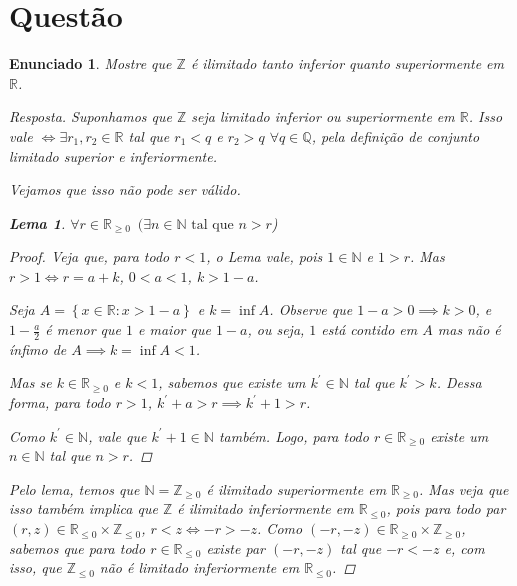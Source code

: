 \documentclass[a4paper,twoside,11pt]{article}
\newtheorem*{enunciado}{Enunciado}
\newtheorem*{lemma}{Lema}
\begin{document}
\section{Questão}
\begin{enunciado}
    Mostre que $\mathbb{Z}$ é ilimitado tanto inferior quanto superiormente em
    $\mathbb{R}$.

    \begin{proof}[Resposta]
        Suponhamos que $\mathbb{Z}$ seja limitado inferior ou superiormente em $\mathbb{R}$.
        Isso vale $\iff \exists r_1, r_2 \in \mathbb{R}$ tal que $r_1 < q$ e $r_2 > q$
        $\forall q \in \mathbb{Q}$, pela definição de conjunto limitado superior e
        inferiormente.

        Vejamos que isso não pode ser válido.

        \begin{lemma}
            $\forall r \in \mathbb{R}_{\geq 0} \enspace (\exists n \in \mathbb{N} \text{ tal que } n > r$)

            \begin{proof}
                Veja que, para todo $r < 1$, o Lema vale, pois $1 \in \mathbb{N}$ e $1 > r$. Mas $r > 1 \iff r = a + k$,
                $0 < a < 1$, $k > 1 - a$.
                
                Seja $A = \left\{ x \in \mathbb{R} : x > 1 - a \right\}$ e $k = \inf A$. Observe que $1 - a > 0 \implies k > 0$,
                e $1 - \frac{a}{2}$ é menor que $1$ e maior que $1 - a$, ou seja, $1$ está contido em $A$ mas não é
                ínfimo de $A \implies k = \inf A < 1$.

                Mas se $k \in \mathbb{R}_{\geq 0}$ e $k < 1$, sabemos que existe um $k^{\prime} \in \mathbb{N}$ tal que
                $k^{\prime} > k$. Dessa forma, para todo $r > 1$, $k^{\prime} + a > r \implies k^{\prime} + 1 > r$.
                
                Como $k^{\prime} \in \mathbb{N}$, vale que $k^{\prime} + 1 \in \mathbb{N}$ também. Logo,
                para todo $r \in \mathbb{R}_{\geq 0}$ existe um $n \in \mathbb{N}$ tal que $n > r$.
            \end{proof}
        \end{lemma}

        Pelo lema, temos que $\mathbb{N} = \mathbb{Z}_{\geq 0}$ é ilimitado superiormente em $\mathbb{R}_{\geq 0}$.
        Mas veja que isso também implica que $\mathbb{Z}$ é ilimitado inferiormente em $\mathbb{R}_{\leq 0}$, pois para
        todo par $(r, z) \in \mathbb{R}_{\leq 0} \times \mathbb{Z}_{\leq 0}$, $r < z \iff -r > -z$. Como
        $(-r, -z) \in \mathbb{R}_{\geq 0} \times \mathbb{Z}_{\geq 0}$, sabemos que para todo $r \in \mathbb{R}_{\leq 0}$
        existe par $(-r, -z)$ tal que $-r < -z$ e, com isso, que $\mathbb{Z}_{\leq 0}$ não é limitado inferiormente
        em $\mathbb{R}_{\leq 0}$.


\end{proof}
\end{enunciado}
\end{document}
